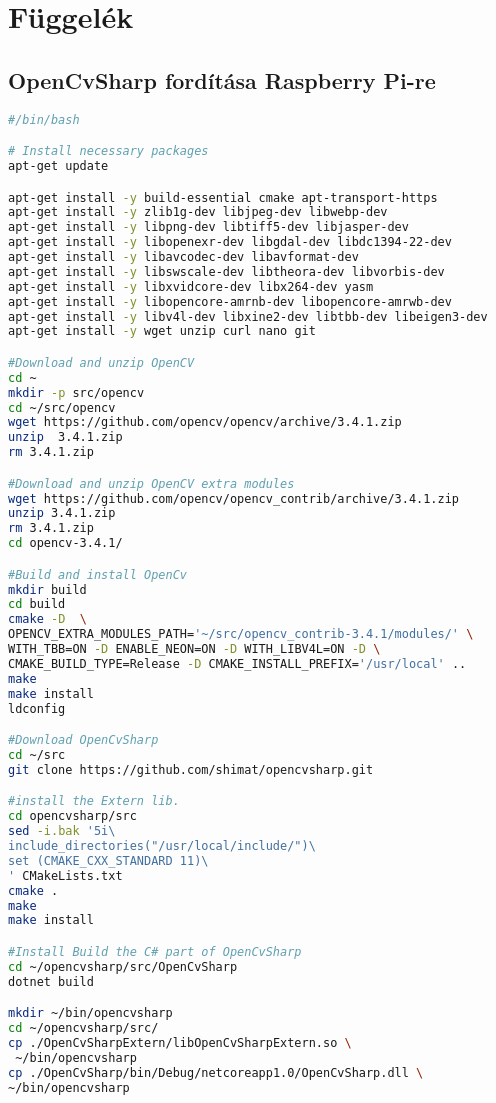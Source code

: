 \appendix

\chapter*{Függelék}

\setcounter{chapter}{6}     %

\newpage


\section{OpenCvSharp fordítása Raspberry Pi-re} \label{rpi-build-script}
\begin{scriptsize}
\begin{lstlisting}[language=bash,caption={bash version}]
#/bin/bash

# Install necessary packages
apt-get update

apt-get install -y build-essential cmake apt-transport-https
apt-get install -y zlib1g-dev libjpeg-dev libwebp-dev 
apt-get install -y libpng-dev libtiff5-dev libjasper-dev  
apt-get install -y libopenexr-dev libgdal-dev libdc1394-22-dev
apt-get install -y libavcodec-dev libavformat-dev
apt-get install -y libswscale-dev libtheora-dev libvorbis-dev 
apt-get install -y libxvidcore-dev libx264-dev yasm
apt-get install -y libopencore-amrnb-dev libopencore-amrwb-dev
apt-get install -y libv4l-dev libxine2-dev libtbb-dev libeigen3-dev
apt-get install -y wget unzip curl nano git

#Download and unzip OpenCV
cd ~
mkdir -p src/opencv
cd ~/src/opencv
wget https://github.com/opencv/opencv/archive/3.4.1.zip
unzip  3.4.1.zip
rm 3.4.1.zip

#Download and unzip OpenCV extra modules
wget https://github.com/opencv/opencv_contrib/archive/3.4.1.zip
unzip 3.4.1.zip
rm 3.4.1.zip
cd opencv-3.4.1/

#Build and install OpenCv
mkdir build
cd build
cmake -D  \
OPENCV_EXTRA_MODULES_PATH='~/src/opencv_contrib-3.4.1/modules/' \
WITH_TBB=ON -D ENABLE_NEON=ON -D WITH_LIBV4L=ON -D \
CMAKE_BUILD_TYPE=Release -D CMAKE_INSTALL_PREFIX='/usr/local' ..
make
make install
ldconfig

#Download OpenCvSharp
cd ~/src
git clone https://github.com/shimat/opencvsharp.git

#install the Extern lib.
cd opencvsharp/src
sed -i.bak '5i\
include_directories("/usr/local/include/")\
set (CMAKE_CXX_STANDARD 11)\
' CMakeLists.txt
cmake .
make
make install

#Install Build the C# part of OpenCvSharp
cd ~/opencvsharp/src/OpenCvSharp
dotnet build

mkdir ~/bin/opencvsharp
cd ~/opencvsharp/src/
cp ./OpenCvSharpExtern/libOpenCvSharpExtern.so \
 ~/bin/opencvsharp
cp ./OpenCvSharp/bin/Debug/netcoreapp1.0/OpenCvSharp.dll \
~/bin/opencvsharp
\end{lstlisting}
\end{scriptsize}
